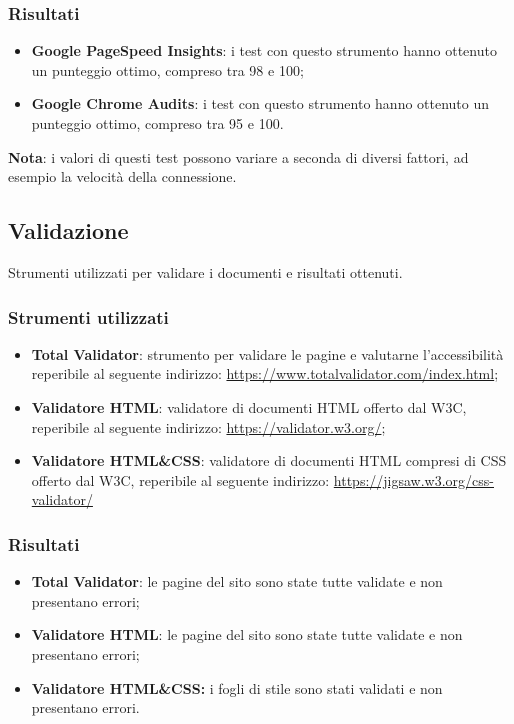 \documentclass[12pt]{article}
\begin{document}
	\subsubsection{Risultati}
		\begin{itemize}
			\item \textbf{Google PageSpeed Insights}: i test con questo strumento hanno ottenuto un punteggio ottimo, compreso tra 98 e 100;
			\item \textbf{Google Chrome Audits}: i test con questo strumento hanno ottenuto un punteggio ottimo, compreso tra 95 e 100.
		\end{itemize}
	\textbf{Nota}: i valori di questi test possono variare a seconda di diversi fattori, ad esempio la velocità della connessione.
	\subsection{Validazione}
	Strumenti utilizzati per validare i documenti e risultati ottenuti.
	\subsubsection{Strumenti utilizzati}
	\begin{itemize}
		\item \textbf{Total Validator}: strumento per validare le pagine e valutarne l'accessibilità reperibile al seguente indirizzo: \url{https://www.totalvalidator.com/index.html};
		\item \textbf{Validatore HTML}: validatore di documenti HTML offerto dal W3C, reperibile al seguente indirizzo: \url{https://validator.w3.org/};
		\item \textbf{Validatore HTML\&CSS}: validatore di documenti HTML compresi di CSS offerto dal W3C, reperibile al seguente indirizzo: \url{https://jigsaw.w3.org/css-validator/}
	\end{itemize}
	\subsubsection{Risultati}
		\begin{itemize}
			\item \textbf{Total Validator}: le pagine del sito sono state tutte validate e non presentano errori;
			\item \textbf{Validatore HTML}: le pagine del sito sono state tutte validate e non presentano errori;
			\item \textbf{Validatore HTML\&CSS:} i fogli di stile sono stati validati e non presentano errori.
		\end{itemize}
	
\end{document}
